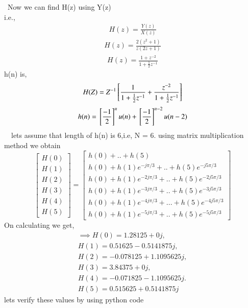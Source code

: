 \documentclass[journal,12pt,twocolumn]{IEEEtran}
\renewcommand\thesection{\arabic{section}}
\begin{document}
\begin{enumerate}[label=\thesection.\arabic*.,ref=\thesection.\theenumi]
\
Now we can find H(z) using Y(z)\\
 i.e.,
\begin{align}
    H(z) = \frac{Y(z)}{X(z)}
\end{align}
\begin{align}
 H(z) = \frac{2(z^2+1)}{z(2z+1)}
\end{align}
\begin{align}
 H(z) = \frac{1+z^{-2}}{1+\frac{1}{2}z^{-1}}
\end{align}
 h(n) is,
\begin{align}
 H(Z)= Z^{-1}{}\left[\frac{1}{1+\frac{1}{2}z^{-1}} + \frac{z^{-2}}{1+\frac{1}{2}z^{-1}}\right]
\end{align}
\begin{align}
 h(n)={}\left[\frac{-1}{2}\right]^nu(n) + {}\left[\frac{-1}{2}\right]^{n-2}u(n-2)
\end{align}
\
\
lets  assume that length of h(n) is 6,i.e, N = 6.
using matrix multiplication method we obtain
\begin{equation}
\begin{bmatrix} H(0) \\ H(1) \\ H(2) \\ H(3) \\ H(4) \\ H(5) \end{bmatrix}
=
\begin{bmatrix}
 h(0)+..+h(5)\\h(0)+h(1)e^{-j\pi/3}+..+h(5)e^{-j5\pi/3}\\h(0)+h(1)e^{-2j\pi/3}+..+h(5)e^{-2j5\pi/3}\\h(0)+h(1)e^{-3j\pi /3}+..+h(5)e^{-3j5\pi/3}\\h(0)+h(1)e^{-4j\pi /3}+...+h(5)e^{-4j5\pi/3}\\h(0)+h(1)e^{-5j\pi/3}+..+h(5)e^{-5j5\pi/3}
\end{bmatrix}
\end{equation}
On calculating we get,
\begin{align}
\implies H(0) = 1.28125 + 0j,\\
 H(1) = 0.51625 - 0.5141875j,\\
 H(2) = -0.078125 + 1.1095625j,\\
 H(3) = 3.84375 + 0j,\\
 H(4) = -0.071825 - 1.1095625j.\\
 H(5) = 0.515625 + 0.5141875j
\end{align}
lets verify these values by using python code
\\

\end{enumerate}
\end{document}
